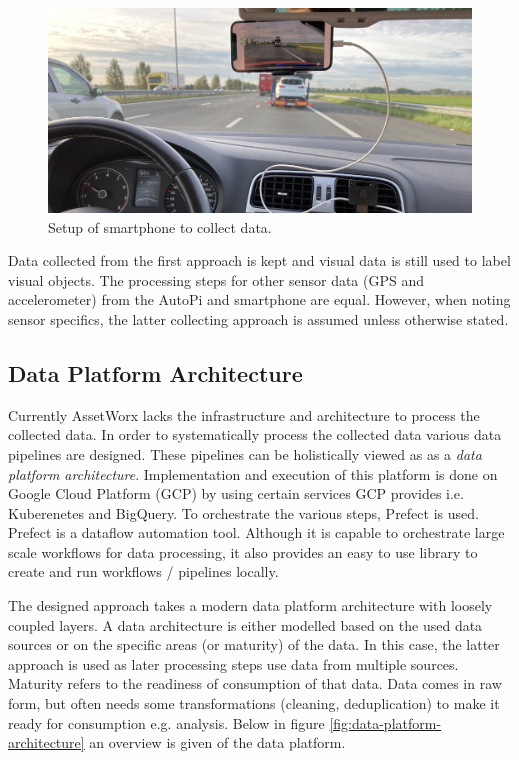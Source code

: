 \begin{figure}[H]
\begin{center}
\includegraphics[width=\textwidth,keepaspectratio]{images/4_data/smartphone-setup.jpg}
\end{center}
\caption{Setup of smartphone to collect data.}
\label{fig:smartphone-collector}
\end{figure}

Data collected from the first approach is kept and visual data is still used to label visual objects. The processing steps for other sensor data (GPS and accelerometer) from the AutoPi and smartphone are equal. However, when noting sensor specifics, the latter collecting approach is assumed unless otherwise stated.


\subsection{Data Platform Architecture}
Currently AssetWorx lacks the infrastructure and architecture to process the collected data. In order to systematically process the collected data various data pipelines are designed. These pipelines can be holistically viewed as as a \textit{data platform architecture}. Implementation and execution of this platform is done on Google Cloud Platform (GCP) by using certain services GCP provides i.e. Kuberenetes and BigQuery. To orchestrate the various steps, Prefect\cite{Prefect} is used. Prefect is a dataflow automation tool. Although it is capable to orchestrate large scale workflows for data processing, it also provides an easy to use library to create and run workflows / pipelines locally.

The designed approach takes a modern data platform architecture with loosely coupled layers. A data architecture is either modelled based on the used data sources or on the specific areas (or maturity) of the data. In this case, the latter approach is used as later processing steps use data from multiple sources. Maturity refers to the readiness of consumption of that data. Data comes in raw form, but often needs some transformations (cleaning, deduplication) to make it ready for consumption e.g. analysis.  Below in figure \ref{fig:data-platform-architecture} an overview is given of the data platform.

